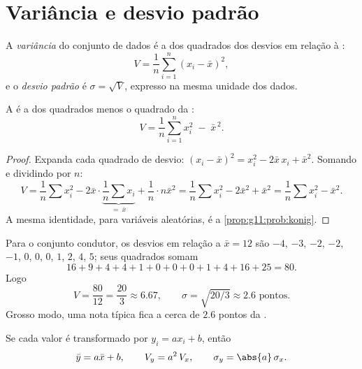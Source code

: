 \section{Variância e desvio padrão}

\begin{definition}\label{def:g11:stat:variance}
A \emph{variância} do conjunto de dados é a  dos
quadrados dos desvios em relação à :
\[
V = \frac{1}{n}\sum_{i=1}^{n} (x_i - \bar x)^2,
\]
e o \emph{desvio padrão} é $\sigma = \sqrt{V}$,
expresso na mesma unidade dos dados.
\end{definition}

\begin{proposition}\label{prop:g11:stat:shortcut}
A  é a  dos quadrados menos o quadrado da :
\[
V = \frac{1}{n}\sum_{i=1}^{n} x_i^2 \;-\; \bar x^{\,2}.
\]
\end{proposition}

\begin{proof}
Expanda cada quadrado de desvio:
$(x_i - \bar x)^2 = x_i^2 - 2\bar x\, x_i + \bar x^2$. Somando e
dividindo por $n$:
\[
V = \frac1n \sum x_i^2 - 2\bar x \cdot \underbrace{\frac1n \sum
x_i}_{=\ \bar x} + \frac1n \cdot n\bar x^2
= \frac1n\sum x_i^2 - 2\bar x^2 + \bar x^2
= \frac1n\sum x_i^2 - \bar x^2 .
\]
A mesma identidade, para variáveis aleatórias, é a
\cref{prop:g11:prob:konig}.
\end{proof}

\begin{example}\label{ex:g11:stat:variance}
Para o conjunto condutor, os desvios em relação a $\bar x = 12$ são $-4$,
$-3$, $-2$, $-2$, $-1$, $0$, $0$, $0$, $1$, $2$, $4$, $5$; seus quadrados
somam
\[
16 + 9 + 4 + 4 + 1 + 0 + 0 + 0 + 1 + 4 + 16 + 25 = 80 .
\]
Logo
\[
V = \frac{80}{12} = \frac{20}{3} \approx 6.67,
\qquad
\sigma = \sqrt{20/3} \approx 2.6 \text{ pontos}.
\]
Grosso modo, uma nota típica fica a cerca de $2.6$ pontos da .
\end{example}

\begin{proposition}\label{prop:g11:stat:affine}
Se cada valor é transformado por $y_i = a x_i + b$, então
\[
\bar y = a \bar x + b,
\qquad
V_y = a^2\, V_x,
\qquad
\sigma_y = \abs{a}\,\sigma_x .
\]
\end{proposition}

